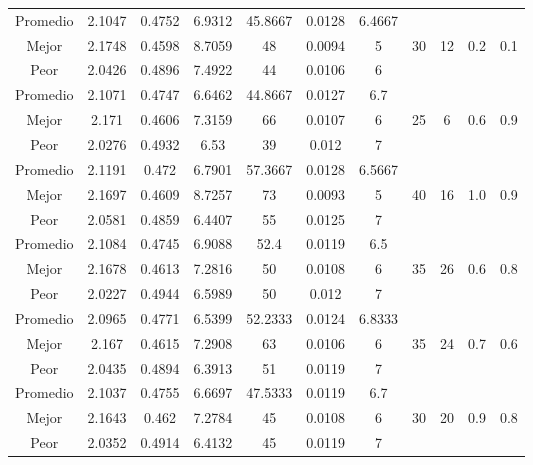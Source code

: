 \begin{table}[h!]
\begin{center}
\begin{tabular}{|c|c|c|c|c|c|c|c|c|c|c|}
        \hline
        \hline
            Promedio  & 2.1047 & 0.4752 & 6.9312 & 45.8667 & 0.0128 & 6.4667 &  &  &  & \\
            \cline{1-7}
            Mejor & 2.1748 & 0.4598  & 8.7059 & 48 & 0.0094 & 5 & 30 & 12 & 0.2 & 0.1\\
            \cline{1-7}
            Peor & 2.0426 & 0.4896  & 7.4922 & 44 & 0.0106 & 6 &  &  &  & \\
        \hline
        \hline
            Promedio  & 2.1071 & 0.4747 & 6.6462 & 44.8667 & 0.0127 & 6.7 &  &  &  & \\
            \cline{1-7}
            Mejor & 2.171 & 0.4606  & 7.3159 & 66 & 0.0107 & 6 & 25 & 6 & 0.6 & 0.9\\
            \cline{1-7}
            Peor & 2.0276 & 0.4932  & 6.53 & 39 & 0.012 & 7 &  &  &  & \\
        \hline
        \hline
            Promedio  & 2.1191 & 0.472 & 6.7901 & 57.3667 & 0.0128 & 6.5667 &  &  &  & \\
            \cline{1-7}
            Mejor & 2.1697 & 0.4609  & 8.7257 & 73 & 0.0093 & 5 & 40 & 16 & 1.0 & 0.9\\
            \cline{1-7}
            Peor & 2.0581 & 0.4859  & 6.4407 & 55 & 0.0125 & 7 &  &  &  & \\
        \hline
        \hline
            Promedio  & 2.1084 & 0.4745 & 6.9088 & 52.4 & 0.0119 & 6.5 &  &  &  & \\
            \cline{1-7}
            Mejor & 2.1678 & 0.4613  & 7.2816 & 50 & 0.0108 & 6 & 35 & 26 & 0.6 & 0.8\\
            \cline{1-7}
            Peor & 2.0227 & 0.4944  & 6.5989 & 50 & 0.012 & 7 &  &  &  & \\
        \hline
        \hline
            Promedio  & 2.0965 & 0.4771 & 6.5399 & 52.2333 & 0.0124 & 6.8333 &  &  &  & \\
            \cline{1-7}
            Mejor & 2.167 & 0.4615  & 7.2908 & 63 & 0.0106 & 6 & 35 & 24 & 0.7 & 0.6\\
            \cline{1-7}
            Peor & 2.0435 & 0.4894  & 6.3913 & 51 & 0.0119 & 7 &  &  &  & \\
        \hline
        \hline
            Promedio  & 2.1037 & 0.4755 & 6.6697 & 47.5333 & 0.0119 & 6.7 &  &  &  & \\
            \cline{1-7}
            Mejor & 2.1643 & 0.462  & 7.2784 & 45 & 0.0108 & 6 & 30 & 20 & 0.9 & 0.8\\
            \cline{1-7}
            Peor & 2.0352 & 0.4914  & 6.4132 & 45 & 0.0119 & 7 &  &  &  & \\

\end{tabular}
\end{center}
\end{table}
